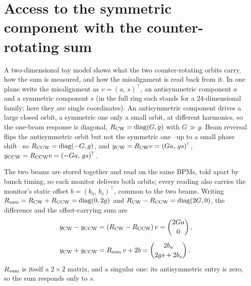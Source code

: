 \documentclass[aps,prab,reprint,superscriptaddress,nofootinbib]{revtex4-2}
\begin{document}
	\section{Access to the symmetric component with the counter-rotating sum}
	\label{app:sum}

	A two-dimensional toy model shows what the two counter-rotating orbits carry, how the sum is measured, and how the misalignment is read back from it. In one plane write the
	misalignment as $v=(a,\,s)^{\!\top}$, an antisymmetric component $a$ and a symmetric
	component $s$ (in the full ring each stands for a $24$-dimensional family; here they are
	single coordinates). An antisymmetric component drives a large closed orbit, a symmetric
	one only a small orbit, at different harmonics, so the one-beam response is diagonal,
	$R_{\rm CW}=\mathrm{diag}(G,g)$ with $G\gg g$. Beam reversal flips the antisymmetric orbit but not the symmetric one --up to a small phase shift-- so $R_{\rm CCW} = \mathrm{diag}(-G,g)$, and $y_{\rm CW}=R_{\rm CW}v=(Ga,\,gs)^{\!\top}$, $y_{\rm CCW}=R_{\rm CCW}v=(-Ga,\,gs)^{\!\top}$.

	The two beams are stored together and read on the same BPMs, told apart by bunch timing,
	so each monitor delivers both orbits; every reading also carries the monitor's static
	offset $b=(b_a,\,b_s)^{\!\top}$, common to the two beams. Writing $R_{\rm sum}=R_{\rm CW}+R_{\rm CCW}=\mathrm{diag}(0,2g)$ and $R_{\rm CW}-R_{\rm CCW}=\mathrm{diag}(2G,0)$, the difference and the offset-carrying sum are
	\begin{equation}
		\begin{split}
			y_{\rm CW}-y_{\rm CCW} &= (R_{\rm CW}-R_{\rm CCW})\,v = \begin{pmatrix}2Ga\\[2pt] 0\end{pmatrix},\\[4pt]
			y_{\rm CW}+y_{\rm CCW} &= R_{\rm sum}\,v + 2b = \begin{pmatrix}2b_a\\[2pt] 2gs+2b_s\end{pmatrix}.
		\end{split}
		\label{eq:sumdiff}
	\end{equation}
	$R_{\rm sum}$ is itself a $2\times2$ matrix, and a singular one: its antisymmetric entry is zero, so the sum responds only to $s$.
\end{document}
